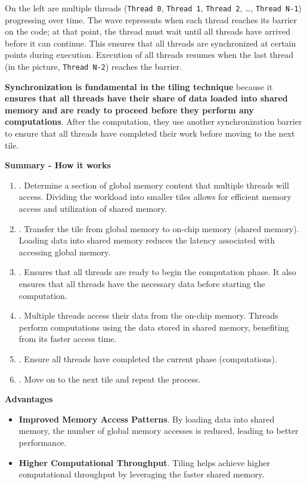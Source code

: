 \noindent
On the left are multiple threads (\texttt{Thread 0}, \texttt{Thread 1}, \texttt{Thread 2}, \dots, \texttt{Thread N-1}) progressing over time. The wave represents when each thread reaches its barrier on the code; at that point, the thread must wait until all threads have arrived before it can continue. This ensures that all threads are synchronized at certain points during execution. Execution of all threads resumes when the last thread (in the picture, \texttt{Thread N-2}) reaches the barrier.

\highspace
\textbf{Synchronization is fundamental in the tiling technique} because it \textbf{ensures that all threads have their share of data loaded into shared memory and are ready to proceed before they perform any computations}. After the computation, they use another synchronization barrier to ensure that all threads have completed their work before moving to the next tile.

\newpage

\begin{flushleft}
    \textcolor{Green3}{ \textbf{Summary - How it works}}
\end{flushleft}
\begin{enumerate}
    \item {}. Determine a section of global memory content that multiple threads will access. Dividing the workload into smaller tiles allows for efficient memory access and utilization of shared memory.
    \item {}. Transfer the tile from global memory to on-chip memory (shared memory). Loading data into shared memory reduces the latency associated with accessing global memory.
    \item {}. Ensures that all threads are ready to begin the computation phase. It also ensures that all threads have the necessary data before starting the computation.
    \item {}. Multiple threads access their data from the on-chip memory. Threads perform computations using the data stored in shared memory, benefiting from its faster access time.
    \item {}. Ensure all threads have completed the current phase (computations).
    \item {}. Move on to the next tile and repeat the process.
\end{enumerate}

\highspace
\begin{flushleft}
    \textcolor{Green3}{ \textbf{Advantages}}
\end{flushleft}
\begin{itemize}
    \item[\textcolor{Green3}{\faIcon{check}}] \textbf{Improved Memory Access Patterns}. By loading data into shared memory, the number of global memory accesses is reduced, leading to better performance.
    \item[\textcolor{Green3}{\faIcon{check}}] \textbf{Higher Computational Throughput}. Tiling helps achieve higher computational throughput by leveraging the faster shared memory.
\end{itemize}
